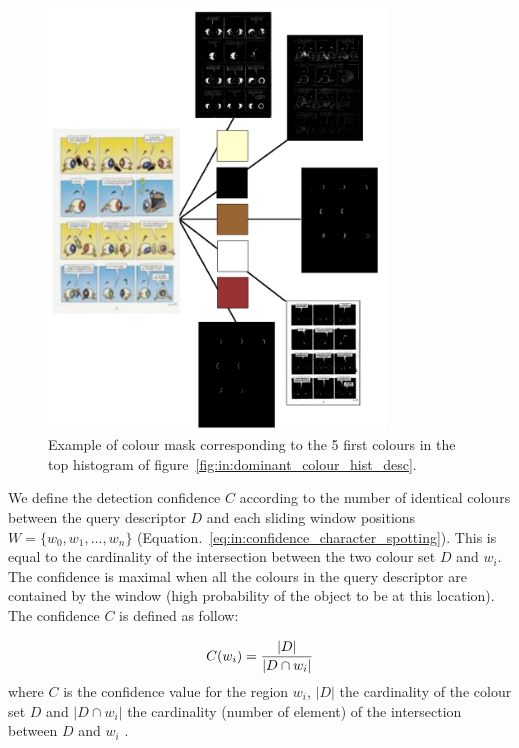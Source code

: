  \begin{figure}[!ht]  %
   \centering
  \includegraphics[width=0.8\textwidth]{masks.png}
  \caption[Colour mask corresponding to five colour of the query descriptor]{Example of colour mask corresponding to the 5 first colours in the top histogram of figure~\ref{fig:in:dominant_colour_hist_desc}.}
  \label{fig:in:masks}
 \end{figure}


We define the detection confidence $C$ according to the number of identical colours between the query descriptor $D$ and each sliding window positions $W=\{w_0,w_1,...,w_n\}$ (Equation.~\ref{eq:in:confidence_character_spotting}).
This is equal to the cardinality of the intersection between the two colour set $D$ and $w_i$. The confidence is maximal when all the colours in the query descriptor are contained by the window (high probability of the object to be at this location).
The confidence $C$ is defined as follow:

\begin{equation}\label{eq:in:confidence_character_spotting}
   C(w_i) = \frac{|D|}{|D \cap w_i|}\\
 \end{equation}
where $C$ is the confidence value for the region $w_i$, $|D|$ the cardinality of the colour set $D$ and $|D \cap w_i|$ the cardinality (number of element) of the intersection between $D$ and $w_i$ .

